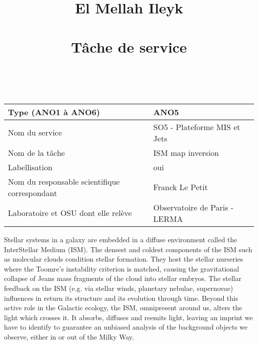 \documentclass[a4paper,12pt,onecolumn]{article}
\title{	
\vspace*{-2cm}
\normalfont \normalsize 
El Mellah Ileyk \\ [25pt] %
\vspace*{-0.4cm}
\horrule{0.5pt} \\[0.4cm] %
\huge T\^{a}che de service\\ %
\horrule{2pt} \\[0.5cm] %
}
\date{\tiny }%
\makeatletter
\newcommand*{\eg}{e.g.\@\xspace}
\makeatother
\begin{document}


\maketitle
\thispagestyle{empty}

\vspace*{-2.8cm}

\begin{table}[h!]
\centering
\label{my-label}
\begin{tabular}{|l|l|}
\hline
Type (ANO1 \`{a} ANO6) & ANO5 \\ \hline
Nom du service & SO5 - Plateforme MIS et Jets \\ \hline
Nom de la t\^{a}che & ISM map inversion \\ \hline
Labellisation & oui \\ \hline
Nom du responsable scientifique correspondant & Franck Le Petit \\ \hline
Laboratoire et OSU dont elle rel\`eve & Observatoire de Paris - LERMA \\ \hline
\end{tabular}
\end{table}


Stellar systems in a galaxy are embedded in a diffuse environment called the InterStellar Medium (ISM). The densest and coldest components of the ISM such as molecular clouds condition stellar formation. They host the stellar nurseries where the Toomre's instability criterion is matched, causing the gravitational collapse of Jeans mass fragments of the cloud into stellar embryos. The stellar feedback on the ISM (\eg via stellar winds, planetary nebulae, supernovae) influences in return its structure and its evolution through time. Beyond this active role in the Galactic ecology, the ISM, omnipresent around us, alters the light which crosses it. It absorbs, diffuses and reemits light, leaving an imprint we have to identify to guarantee an unbiased analysis of the background objects we observe, either in or out of the Milky Way. 
\end{document}
